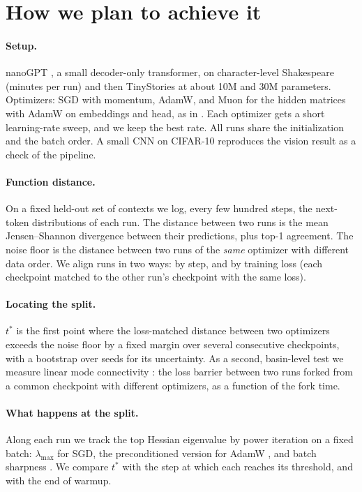 \documentclass[10pt]{article}
\begin{document}
\section{How we plan to achieve it}

\paragraph{Setup.} nanoGPT \citep{karpathy2022nanogpt}, a small decoder-only transformer, on
character-level Shakespeare (minutes per run) and then TinyStories at about 10M and 30M parameters.
Optimizers: SGD with momentum, AdamW, and Muon for the hidden matrices with AdamW on embeddings and
head, as in \citet{jordan2024muon}. Each optimizer gets a short learning-rate sweep, and we keep the
best rate. All runs share the initialization and the batch order. A small CNN on CIFAR-10 reproduces
the vision result as a check of the pipeline.

\paragraph{Function distance.} On a fixed held-out set of contexts we log, every few hundred steps,
the next-token distributions of each run. The distance between two runs is the mean Jensen--Shannon
divergence between their predictions, plus top-1 agreement. The noise floor is the distance between
two runs of the \emph{same} optimizer with different data order. We align runs in two ways: by step,
and by training loss (each checkpoint matched to the other run's checkpoint with the same loss).

\paragraph{Locating the split.} $t^\ast$ is the first point where the loss-matched distance between
two optimizers exceeds the noise floor by a fixed margin over several consecutive checkpoints, with a
bootstrap over seeds for its uncertainty. As a second, basin-level test we measure linear mode
connectivity \citep{frankle2020lmc}: the loss barrier between two runs forked from a common checkpoint
with different optimizers, as a function of the fork time.

\paragraph{What happens at the split.} Along each run we track the top Hessian eigenvalue by power
iteration on a fixed batch: $\lambda_{\max}$ for SGD, the preconditioned version for AdamW
\citep{cohen2022adaptive}, and batch sharpness \citep{andreyev2024eoss}. We compare $t^\ast$ with the
step at which each reaches its threshold, and with the end of warmup.
\end{document}
